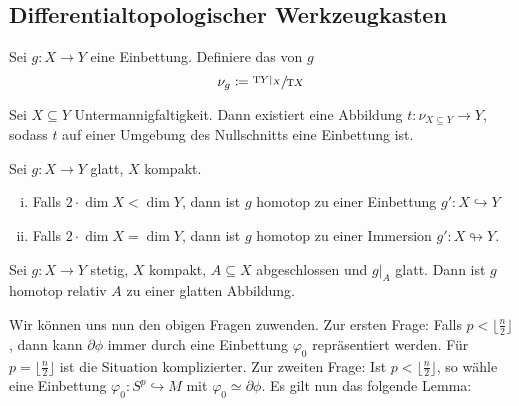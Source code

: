 \subsection*{Differentialtopologischer Werkzeugkasten}

\begin{definition}[{name=[{Normalenbündel}]}]
	Sei $g \colon X \to Y$ eine Einbettung.
	Definiere das  von $g$
	\[
		\nu_g \coloneqq \sfrac{\mathrm{T}\mkern-0.85mu Y|_X}{\mathrm{T}\mkern-0.85mu X}
	\] 
\end{definition}

\begin{satz}[{name={Existenz von Tubenumgebungen}}]
	Sei $X \subseteq Y$ Untermannigfaltigkeit.
	Dann existiert eine Abbildung $t \colon \nu_{X \subseteq Y} \to Y$, sodass $t$ auf einer Umgebung des Nullschnitts eine Einbettung ist.
\end{satz}

\begin{satz}[{name={Whitney}}]
	Sei $g \colon X\to Y$ glatt, $X$ kompakt.
	\begin{enumerate}[(i)]
		\item Falls $2 \cdot \dim X < \dim Y$, dann ist $g$ homotop zu einer Einbettung $g' \colon X \hookrightarrow Y$
		\item Falls $2 \cdot \dim X = \dim Y$, dann ist $g$ homotop zu einer Immersion $g' \colon X \looparrowright Y$.
	\end{enumerate}
\end{satz}

\begin{satz}[{name={Glatte Approximation}}]
	Sei $g \colon X \to Y$ stetig, $X$ kompakt, $A \subseteq X$ abgeschlossen und $g|_A$ glatt.
	Dann ist $g$ homotop relativ $A$ zu einer glatten Abbildung.
\end{satz}

Wir können uns nun den obigen Fragen zuwenden. Zur ersten Frage:
Falls $p < \lfloor \frac{n}{2}\rfloor$, dann kann $\partial \phi$ immer durch eine Einbettung $\varphi_0$ repräsentiert werden.
Für $p = \lfloor \frac{n}{2}\rfloor$ ist die Situation komplizierter.
Zur zweiten Frage: Ist $p < \lfloor \frac{n}{2}\rfloor$, so wähle eine Einbettung $\varphi_0 \colon S^p \hookrightarrow M$ mit $\varphi_0 \simeq \partial \phi$.
Es gilt nun das folgende Lemma:

